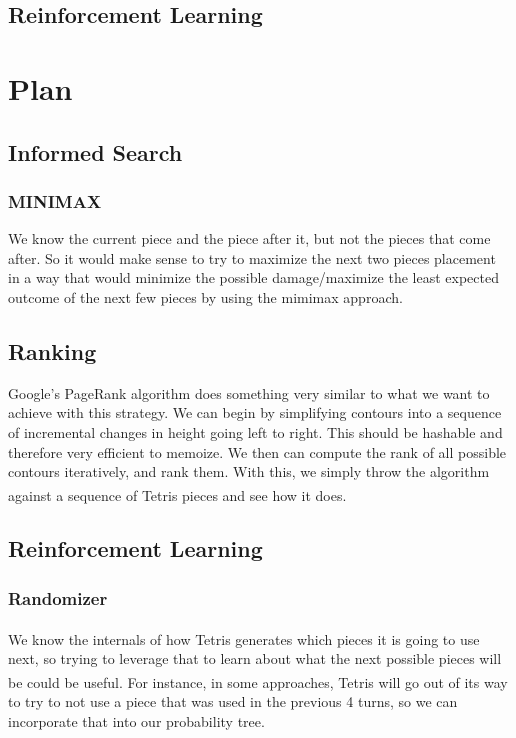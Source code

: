\documentclass{article}
\def\tetris{Tetris\textsuperscript{\textregistered}}
\begin{document}
\subsection{Reinforcement Learning}

\section{Plan}

\subsection{Informed Search}
\subsubsection{MINIMAX} We know the current piece and the piece after it, but not the pieces that come after. So it would make sense to try to maximize the next two pieces placement in a way that would minimize the possible damage/maximize the least expected outcome of the next few pieces by using the mimimax approach.

\subsection{Ranking}
Google's PageRank algorithm does something very similar to what we want to achieve with this strategy. We can begin by simplifying contours into a sequence of incremental changes in height going left to right. This should be hashable and therefore very efficient to memoize. We then can compute the rank of all possible contours iteratively, and rank them. With this, we simply throw the algorithm against a sequence of \tetris{} pieces and see how it does.

\subsection{Reinforcement Learning}
\subsubsection{Randomizer} We know the internals of how \tetris{} generates which pieces it is going to use next, so trying to leverage that to learn about what the next possible pieces will be could be useful. For instance, in some approaches, \tetris{} will go out of its way to try to not use a piece that was used in the previous 4 turns, so we can incorporate that into our probability tree.
\end{document}
